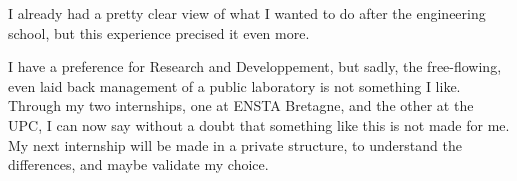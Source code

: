 I already had a pretty clear view of what I wanted to do after the engineering school, but this experience precised it even more.

I have a preference for Research and Developpement, but sadly, the free-flowing, even laid back management of a public laboratory is not something I like.
Through my two internships, one at ENSTA Bretagne, and the other at the UPC, I can now say without a doubt that something like this is not made for me.\\

My next internship will be made in a private structure, to understand the differences, and maybe validate my choice.
